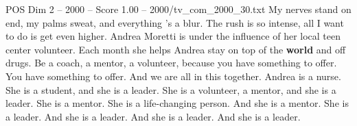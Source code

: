 \begin{textsample}{POS Dim 2 – 2000 – Score 1.00 – 2000/tv\_com\_2000\_30.txt}  \label{ex:f2_pos_084}
My nerves stand on end, my palms sweat, and everything 's a blur.
The rush is so intense, all I want to do is get even higher.
Andrea Moretti is under the influence of her local teen center volunteer.
Each month she helps Andrea stay on top of the \textbf{world} and off drugs.
Be a coach, a mentor, a volunteer, because you have something to offer.
You have something to offer.
And we are all in this together.
Andrea is a nurse.
She is a student, and she is a leader.
She is a volunteer, a mentor, and she is a leader.
She is a mentor.
She is a life-changing person.
And she is a mentor.
She is a leader.
And she is a leader.
And she is a leader.
And she is a leader.

\end{textsample}
